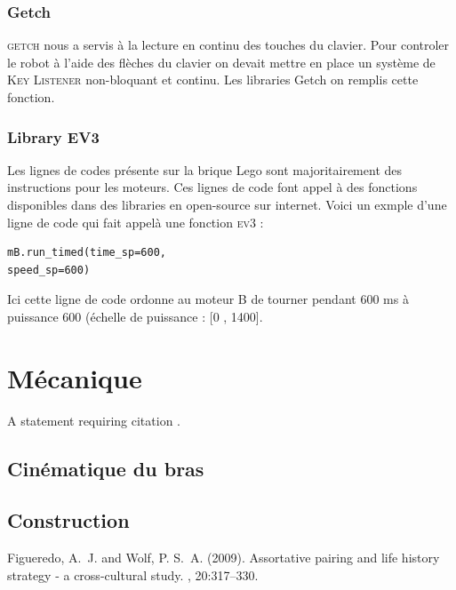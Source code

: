 \documentclass[twoside,twocolumn, 16pt]{article}
\begin{document}
\subsubsection{Getch}
\textsc{getch} nous a servis à la lecture en continu des touches du clavier. Pour controler le robot à l'aide des flèches du clavier on devait mettre en place un système de \textsc{Key Listener} non-bloquant et continu. Les libraries Getch on remplis cette fonction.

\subsubsection{Library EV3}
Les lignes de codes présente sur la brique Lego sont majoritairement des instructions pour les moteurs. Ces lignes de code font appel à des fonctions disponibles dans des libraries en open-source sur internet. Voici un exmple d'une ligne de code qui fait appelà une fonction \textsc{ev3} : \\
\vspace{-0.5cm}
\begin{lstlisting}
mB.run_timed(time_sp=600, 
speed_sp=600)
\end{lstlisting}
Ici cette ligne de code ordonne au moteur B de tourner pendant 600 ms à puissance 600 (échelle de puissance : [0 , 1400].


\section{Mécanique}


A statement requiring citation \cite{Figueredo:2009dg}.
\blindtext %
\subsection{Cinématique du bras}
\subsection{Construction}

\blindtext %


\begin{thebibliography}{99} %

Figueredo, A.~J. and Wolf, P. S.~A. (2009).
\newblock Assortative pairing and life history strategy - a cross-cultural
  study.
, 20:317--330.
 
\end{thebibliography}

\end{document}
